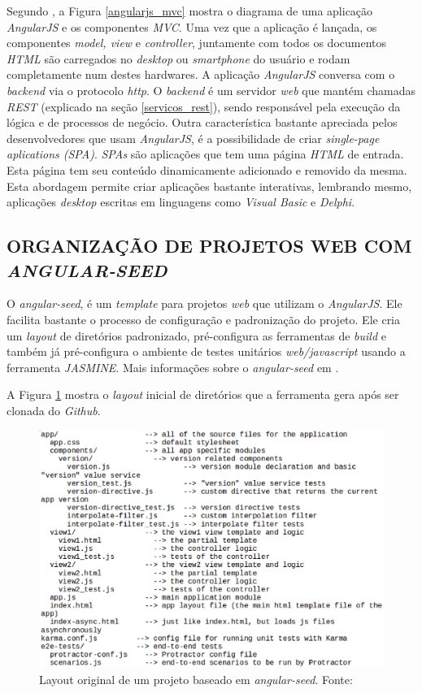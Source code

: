 Segundo , a Figura \ref{angularjs_mvc} mostra o diagrama de uma aplicação \emph{AngularJS} e os componentes \emph{MVC}.  Uma vez que a aplicação é lançada, os componentes \emph{model, view} e \emph{controller}, juntamente com todos os documentos \emph{HTML} são carregados no \emph{desktop} ou \emph{smartphone} do usuário e rodam completamente num destes hardwares.  A aplicação \emph{AngularJS} conversa com o \emph{backend} via o protocolo \emph{http}.  O \emph{backend} é um servidor \emph{web} que mantém chamadas \emph{REST} (explicado na seção \ref{servicos_rest}), sendo responsável pela execução da lógica e de processos de negócio.  
Outra característica bastante apreciada pelos desenvolvedores que usam \emph{AngularJS}, é a possibilidade de criar \emph{single-page aplications (SPA)}. 
\emph{SPAs} são aplicações que tem uma página \emph{HTML} de entrada. 
Esta página tem seu conteúdo dinamicamente adicionado e removido da mesma.
Esta abordagem permite criar aplicações bastante interativas, lembrando mesmo, aplicações \emph{desktop} escritas em linguagens como \emph{Visual Basic} e \emph{Delphi}.

\subsection{ORGANIZAÇÃO DE PROJETOS WEB COM \emph{ANGULAR-SEED}}
\label{angular_seed}

O \emph{angular-seed}, é um \emph{template} para projetos \emph{web} que utilizam o \emph{AngularJS}. 
Ele facilita bastante o processo de configuração e padronização do projeto. 
Ele cria um \emph{layout} de diretórios padronizado, pré-configura as ferramentas de \emph{build} e também já pré-configura o ambiente de testes unitários \emph{web/javascript} usando a ferramenta \emph{JASMINE}. 
Mais informações sobre o \emph{angular-seed} em .

A Figura \ref{seed} mostra o \emph{layout} inicial de diretórios que a ferramenta gera após ser clonada do \emph{Github}.

\begin{figure}[ht]
	\centering
	\includegraphics[width=14cm]{figuras/seed.eps}
	\caption{Layout original de um projeto baseado em \emph{angular-seed}. Fonte: \cite{Google2015b}}
	\label{seed}
\end{figure}

